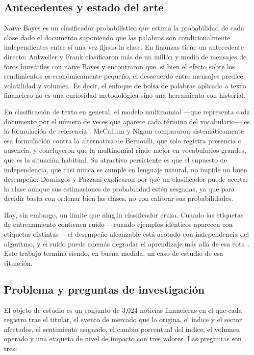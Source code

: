 \documentclass[11pt, a4paper]{article}
\begin{document}
\subsection{Antecedentes y estado del arte}

Naïve Bayes es un clasificador probabilístico que estima la probabilidad de cada clase dado el
documento suponiendo que las palabras son condicionalmente independientes entre sí una vez fijada
la clase. En finanzas tiene un antecedente directo: Antweiler y Frank \cite{antweiler2004}
clasificaron más de un millón y medio de mensajes de foros bursátiles con naïve Bayes y
encontraron que, si bien el efecto sobre los rendimientos es económicamente pequeño, el desacuerdo
entre mensajes predice volatilidad y volumen. Es decir, el enfoque de bolsa de palabras aplicado a
texto financiero no es una curiosidad metodológica sino una herramienta con historial.

En clasificación de texto en general, el modelo multinomial —que representa cada documento por el
número de veces que aparece cada término del vocabulario— es la formulación de referencia
\cite{manning2008}. McCallum y Nigam \cite{mccallum1998} compararon sistemáticamente esa
formulación contra la alternativa de Bernoulli, que solo registra presencia o ausencia, y
concluyeron que la multinomial rinde mejor en vocabularios grandes, que es la situación habitual.
Su atractivo persistente es que el supuesto de independencia, que casi nunca se cumple en lenguaje
natural, no impide un buen desempeño: Domingos y Pazzani \cite{domingos1997} explicaron por qué un
clasificador puede acertar la clase aunque sus estimaciones de probabilidad estén sesgadas, ya que
para decidir basta con ordenar bien las clases, no con calibrar sus probabilidades.

Hay, sin embargo, un límite que ningún clasificador cruza. Cuando las etiquetas de entrenamiento
contienen ruido —cuando ejemplos idénticos aparecen con etiquetas distintas— el desempeño
alcanzable está acotado con independencia del algoritmo, y el ruido puede además degradar el
aprendizaje más allá de esa cota \cite{frenay2014}. Este trabajo termina siendo, en buena medida,
un caso de estudio de esa situación.

\subsection{Problema y preguntas de investigación}

El objeto de estudio es un conjunto de 3{,}024 noticias financieras en el que cada registro trae el
titular, el evento de mercado que lo origina, el índice y el sector afectados, el sentimiento
asignado, el cambio porcentual del índice, el volumen operado y una etiqueta de nivel de impacto
con tres valores. Las preguntas son tres:
\end{document}
